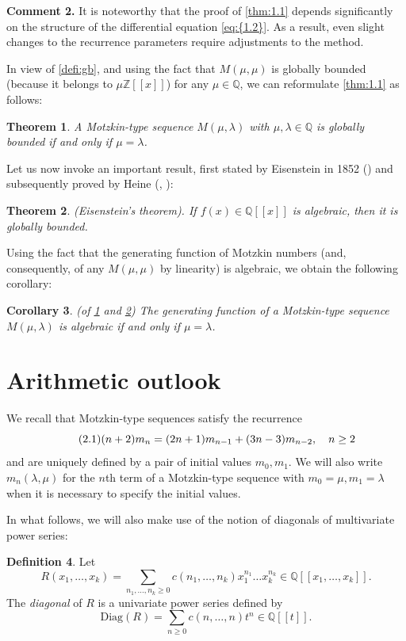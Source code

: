 \documentclass[11pt]{article}
\theoremstyle{definition}
\newtheorem{defi}{Definition}[section]
\theoremstyle{plain}
\newtheorem{thm}[defi]{Theorem}
\newtheorem{cor}[defi]{Corollary}
\theoremstyle{remark}
\begin{document}
\noindent \textbf{Comment 2.} It is noteworthy that the proof of \cref{thm:1.1} depends significantly on the structure of the differential equation \eqref{eq:{1.2}}. As a result, even slight changes to the recurrence parameters require adjustments to the method.

In view of \cref{defi:gb}, and using the fact that $M(\mu,\mu)$ is globally bounded (because it belongs to $\mu\mathbb{Z}[[x]]$) for any $\mu \in \mathbb{Q}$, we can reformulate \cref{thm:1.1} as follows:

\begin{thm}\label{thm:1.2}
A Motzkin-type sequence $M(\mu, \lambda)$ with $\mu,\lambda \in \mathbb{Q}$ is globally bounded if and only if $\mu = \lambda$.
\end{thm}
Let us now invoke an important result, first stated by Eisenstein in 1852 (\cite{Eis52}) and subsequently proved by Heine (\cite{Heine53}, \cite{Heine54}):

\begin{thm}\label{thm:Eisenstein} (Eisenstein's theorem). If $f(x) \in \mathbb{Q}[[x]]$ is algebraic, then it is globally bounded.
\end{thm}

Using the fact that the generating function of Motzkin numbers (and, consequently, of any $M(\mu, \mu)$ by linearity) is algebraic, we obtain the following corollary:
\begin{cor}\label{cor:2.1} (of \cref{thm:1.2} and \cref{thm:Eisenstein})
The generating function of a Motzkin-type sequence $M(\mu, \lambda)$ is algebraic if and only if $\mu = \lambda$.
\end{cor}
\section{Arithmetic outlook}\label{sec:arithmetic outlook}

We recall that Motzkin-type sequences satisfy the recurrence
\begin{equation}\label{eq:{2.1}} \tag{2.1}
(n+2)m_n = (2n+1)m_{n-1}+(3n-3)m_{n-2}, \quad n \geq 2
\end{equation}
and are uniquely defined by a pair of initial values $m_0,m_1$. We will also write $m_n(\lambda,\mu)$ for the $n$th term of a Motzkin-type sequence with $m_0=\mu, m_1=\lambda$ when it is necessary to specify the initial values.

In what follows, we will also make use of the notion of diagonals of multivariate power series:
\begin{defi}\label{defi:diag}
Let 
\[R(x_1,\ldots,x_k) = \sum\limits_{n_1,\ldots,n_k\geq0} c(n_1,\ldots,n_k)x_1^{n_1}\ldots x_k^{n_k} \in \mathbb{Q}[[x_1,\ldots,x_k]].\]
The \textit{diagonal} of $R$ is a univariate power series defined by
\[\text{Diag}(R) = \sum\limits_{n\geq0} c(n,\ldots,n)t^n \in \mathbb{Q}[[t]].\]
\end{defi}
\end{document}
